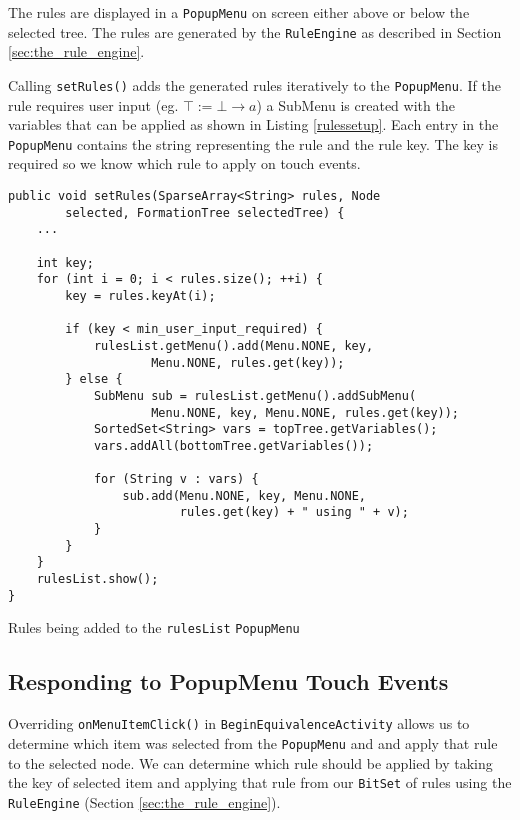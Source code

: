 \documentclass[draft]{report}
\begin{document}
The rules are displayed in a {\tt PopupMenu} on screen either above or below the selected tree. The rules are generated by the {\tt RuleEngine} as described in Section \ref{sec:the_rule_engine}.

Calling {\tt setRules()} adds the generated rules iteratively to the {\tt PopupMenu}. If the rule requires user input (eg. $\top := \bot \to a$) a SubMenu is created with the variables that can be applied as shown in Listing \ref{rulessetup}. Each entry in the {\tt PopupMenu} contains the string representing the rule and the rule key. The key is required so we know which rule to apply on touch events.

\begin{listing}[ht]
\begin{verbatim}
public void setRules(SparseArray<String> rules, Node 
        selected, FormationTree selectedTree) {
    ...

    int key;
    for (int i = 0; i < rules.size(); ++i) {
        key = rules.keyAt(i);

        if (key < min_user_input_required) {
            rulesList.getMenu().add(Menu.NONE, key, 
                    Menu.NONE, rules.get(key));
        } else {
            SubMenu sub = rulesList.getMenu().addSubMenu(
                    Menu.NONE, key, Menu.NONE, rules.get(key));
            SortedSet<String> vars = topTree.getVariables();
            vars.addAll(bottomTree.getVariables());

            for (String v : vars) {
                sub.add(Menu.NONE, key, Menu.NONE, 
                        rules.get(key) + " using " + v);
            }
        }
    }
    rulesList.show();
}
\end{verbatim}
\caption{Rules being added to the {\tt rulesList} {\tt PopupMenu}}
\label{rulessetup}
\end{listing}

\subsection{Responding to PopupMenu Touch Events}
\label{sub:responding_to_popupmenu_touch_events}

Overriding {\tt onMenuItemClick()} in {\tt BeginEquivalenceActivity} allows us to determine which item was selected from the {\tt PopupMenu} and and apply that rule to the selected node. We can determine which rule should be applied by taking the key of selected item and applying that rule from our {\tt BitSet} of rules using the {\tt RuleEngine} (Section \ref{sec:the_rule_engine}).
\end{document}
